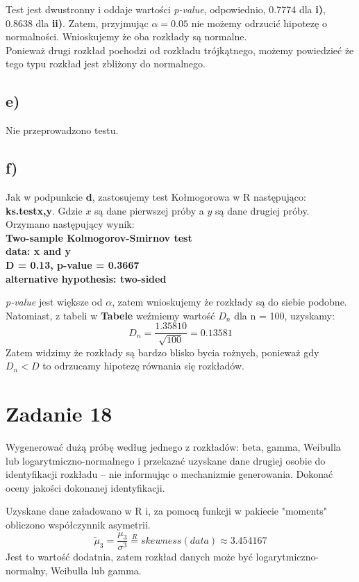 \documentclass{article}
\begin{document}
Test jest dwustronny i oddaje wartości \textit{p-value}, odpowiednio, 0.7774 dla \textbf{i)}, 0.8638 dla \textbf{ii)}. Zatem, przyjmując $\alpha = 0.05$ nie możemy odrzucić hipotezę o normalności. Wnioskujemy że oba rozkłady są normalne. \\
Ponieważ drugi rozkład pochodzi od rozkładu trójkątnego, możemy powiedzieć że tego typu rozkład jest zbliżony do normalnego.

\subsection{e)}
Nie przeprowadzono testu.

\subsection{f)}
Jak w podpunkcie \textbf{d}, zastosujemy test Kołmogorowa w R następująco: \textbf{ks.test{x,y}}. Gdzie $x$ są dane pierwszej próby a $y$ są dane drugiej próby. Orzymano następujący wynik: \\
\textbf{
Two-sample Kolmogorov-Smirnov test \\
data:  x and y \\
D = 0.13, p-value = 0.3667 \\
alternative hypothesis: two-sided \\
}

\textit{p-value} jest większe od $\alpha$, zatem wnioskujemy że rozkłady są do siebie podobne. Natomiast, z tabeli w \textbf{Tabele} weźmiemy wartość $D_n$ dla n = 100, uzyskamy:
\[ D_n = \frac{1.35810}{\sqrt{100}} = 0.13581 \]
Zatem widzimy że rozkłady są bardzo blisko bycia rożnych, ponieważ  gdy $D_n < D$ to odrzucamy hipotezę równania się rozkładów.



\newpage
\section{Zadanie 18}
Wygenerować dużą próbę według jednego z rozkładów: beta, gamma, Weibulla lub logarytmiczno-normalnego i przekazać uzyskane dane drugiej osobie do identyfikacji rozkładu – nie informując o mechanizmie generowania. Dokonać oceny jakości dokonanej identyfikacji. \\ \par

Uzyskane dane załadowano w R i, za pomocą funkcji w pakiecie "moments" obliczono współczynnik asymetrii.
\[ \tilde{\mu}_3 = \frac{\mu_3}{\sigma^3} \overset{R}{=} skewness(data) \approx 3.454167 \]
Jest to wartość dodatnia, zatem rozkład danych może być logarytmiczno-normalny, Weibulla lub gamma.
\end{document}
